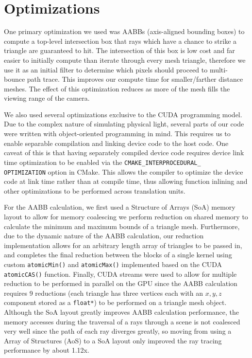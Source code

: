 \documentclass[../main.tex]{subfiles}
\begin{document}
\section{Optimizations}

One primary optimization we used was AABBs (axis-aligned bounding boxes) to
compute a top-level intersection box that rays which have a chance to strike a
triangle are guaranteed to hit. The intersection of this box is low cost and
far easier to initially compute than iterate through every mesh triangle,
therefore we use it as an initial filter to determine which pixels should
proceed to multi-bounce path trace. This improves our compute time for
smaller/farther distance meshes. The effect of this optimization reduces as
more of the mesh fills the viewing range of the camera.


We also used several optimizations exclusive to the CUDA programming model. Due to the
complex nature of simulating physical light, several parts of our code were written with
object-oriented programming in mind. This requires us to enable separable compilation and
linking device code to the host code. One caveat of this is that having separately compiled
device code requires device link time optimization to be enabled via the
\texttt{CMAKE\_INTERPROCEDURAL\_\\OPTIMIZATION} option in CMake. This allows the compiler to
optimize the device code at link time rather than at compile time, thus allowing 
function inlining and other optimizations to be performed across translation units.

For the AABB calculation, we first used a Structure of Arrays (SoA) memory layout to allow for
memory coalescing we perform reduction on shared memory to calculate the minimum and maximum bounds
of a triangle mesh. Furthermore, due to the dynamic nature of the AABB calculation, our reduction
implementation allows for an arbitrary length array of triangles to be passed in, and completes
the final reduction between the blocks of a single kernel using custom \texttt{atomicMin()} and
\texttt{atomicMax()} implemented based on the CUDA \texttt{atomicCAS()} function. Finally,
CUDA streams were used to allow for multiple reduction to be performed in parallel on the GPU
since the AABB calculation requires 9 reductions (each triangle has three vertices each with an
$x, y, z$ component stored as a \texttt{float*}) to be performed on a triangle mesh object. Although
the SoA layout greatly improves AABB calculation performance, the memory accesses during the
traversal of a rays through a scene is not coalesced very well since the path of each ray
diverges greatly, so moving from using a Array of Structures (AoS) to a SoA layout only improved
the ray tracing performance by about 1.12x. 
\end{document}
